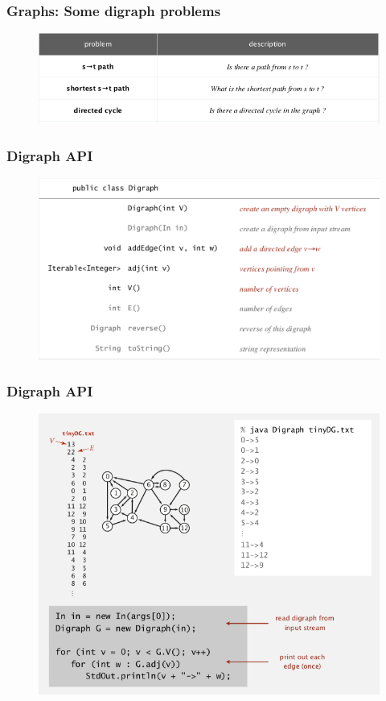 \documentclass[11pt]{beamer}
\begin{document}
  \begin{frame}
	\frametitle	{Graphs: Some digraph problems} 
    \begin{figure}
    	\centering
    	\includegraphics[width=1\linewidth]{"Screenshot 2020-12-03 at 6.36.53 AM"}
    	\label{fig:screenshot-2020-12-03-at-6}
    \end{figure}    
\end{frame}

  \begin{frame}
	\frametitle	{Digraph API} 
    \begin{figure}
    	\centering
    	\includegraphics[width=1\linewidth]{"Screenshot 2020-12-03 at 6.39.16 AM"}
    	\label{fig:screenshot-2020-12-03-at-6}
    \end{figure}  
\end{frame}

 \begin{frame}
	\frametitle	{Digraph API} 
	\begin{figure}
		\centering
		\includegraphics[width=0.9\linewidth]{"Screenshot 2020-12-03 at 6.44.59 AM"}
		\label{fig:screenshot-2020-12-03-at-6}
	\end{figure}	
\end{frame}
\end{document}
